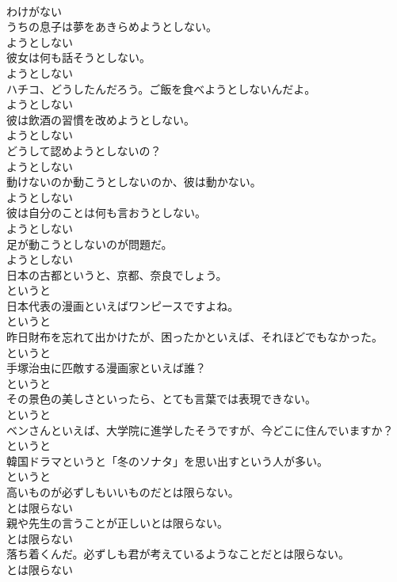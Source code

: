 \documentclass[8pt]{extreport}
\begin{document}
\begin{CJK}{UTF8}{min}
\\	わけがない
\\	うちの息子は夢をあきらめようとしない。	
\\	ようとしない
\\	彼女は何も話そうとしない。	
\\	ようとしない
\\	ハチコ、どうしたんだろう。ご飯を食べようとしないんだよ。	
\\	ようとしない
\\	彼は飲酒の習慣を改めようとしない。	
\\	ようとしない
\\	どうして認めようとしないの？	
\\	ようとしない
\\	動けないのか動こうとしないのか、彼は動かない。	
\\	ようとしない
\\	彼は自分のことは何も言おうとしない。	
\\	ようとしない
\\	足が動こうとしないのが問題だ。	
\\	ようとしない
\\	日本の古都というと、京都、奈良でしょう。	
\\	というと
\\	日本代表の漫画といえばワンピースですよね。	
\\	というと
\\	昨日財布を忘れて出かけたが、困ったかといえば、それほどでもなかった。	
\\	というと
\\	手塚治虫に匹敵する漫画家といえば誰？	
\\	というと
\\	その景色の美しさといったら、とても言葉では表現できない。	
\\	というと
\\	ベンさんといえば、大学院に進学したそうですが、今どこに住んでいますか？	
\\	というと
\\	韓国ドラマというと「冬のソナタ」を思い出すという人が多い。	
\\	というと
\\	高いものが必ずしもいいものだとは限らない。	
\\	とは限らない
\\	親や先生の言うことが正しいとは限らない。	
\\	とは限らない
\\	落ち着くんだ。必ずしも君が考えているようなことだとは限らない。	
\\	とは限らない

\end{CJK}
\end{document}
